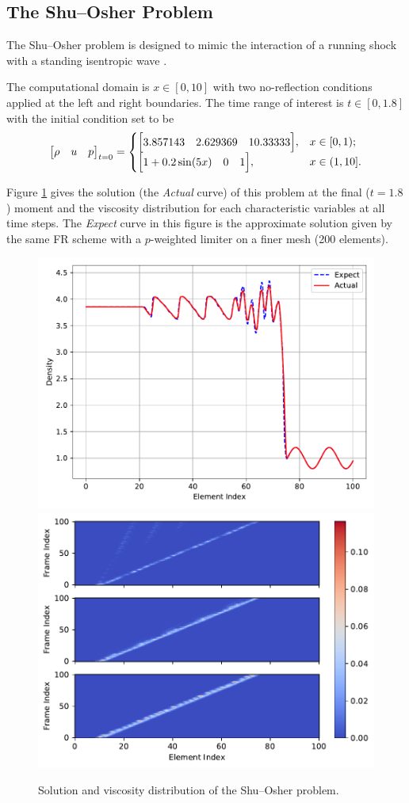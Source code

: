 \documentclass[10pt]{article}
\begin{document}
\subsection{The Shu--Osher Problem}\label{sec:shu_osher}

The Shu--Osher problem is designed to mimic the interaction of a running shock with a standing isentropic wave \cite{Shu_1989}.

The computational domain is $x\in[0, 10]$ with two no-reflection conditions applied at the left and right boundaries.
The time range of interest is $t\in[0, 1.8]$ with the initial condition set to be
\begin{equation}
\mqty[\rho & u & p]_{t=0}
=
\begin{cases}
\mqty[3.857143 & 2.629369 & 10.33333], &x\in[0,1);\\
\mqty[1+0.2\sin(5x) & 0 & 1], &x\in(1,10].
\end{cases}
\end{equation}

Figure \ref{fig:shu_osher} gives the solution (the \emph{Actual} curve) of this problem at the final ($t=1.8$) moment and the viscosity distribution for each characteristic variables at all time steps.
The \emph{Expect} curve in this figure is the approximate solution given by the same FR scheme with a $p$-weighted limiter \cite{Li_2020} on a finer mesh (200 elements).
\begin{figure}[H]
  \centering
  \includegraphics[width=.49\textwidth]{./shu_osher/final/Frame100.pdf}
  \includegraphics[width=.49\textwidth]{./shu_osher/final/Viscosity.pdf}
  \caption{Solution and viscosity distribution of the Shu--Osher problem.}
  \label{fig:shu_osher}
\end{figure}
\end{document}
